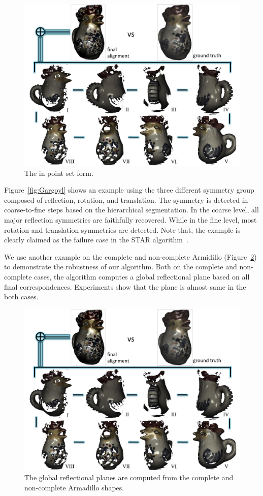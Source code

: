 \begin{figure}[t]
\centering
  \includegraphics[width=0.99\linewidth]{figures/Rooster.pdf}
  \caption{The in point set form.}
\label{fig:Point}
\end{figure}

Figure~\ref{fig:Gargoyl} shows an example using the three different symmetry group composed of reflection, rotation, and translation.
The symmetry is detected in coarse-to-fine steps based on the hierarchical segmentation.
In the coarse level, all major reflection symmetries are faithfully recovered.
While in the fine level, most rotation and translation symmetries are detected.
Note that, the example is clearly claimed as the failure case in the STAR algorithm~\cite{berner2011}.

We use another example on the complete and non-complete Armidillo (Figure~\ref{fig:Arm}) to demonstrate the robustness of our algorithm.
Both on the complete and non-complete cases, the algorithm computes a global reflectional plane based on all final correspondences. 
Experiments show that the plane is almost same in the both cases.

\begin{figure}[t]
\centering
  \includegraphics[width=0.99\linewidth]{figures/Rooster.pdf}
  \caption{The global reflectional planes are computed from the complete and non-complete Armadillo shapes.}
\label{fig:Arm}
\end{figure}

